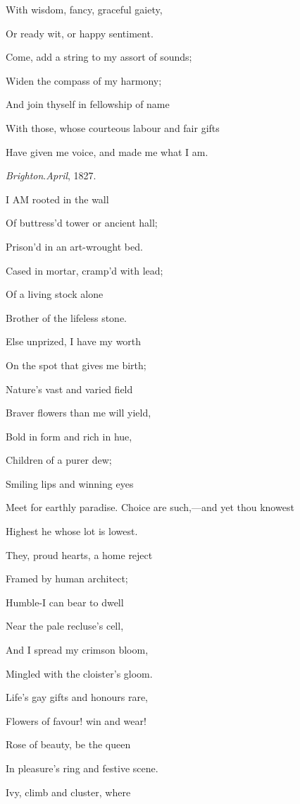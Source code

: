 With wisdom, fancy, graceful gaiety,

Or ready wit, or happy sentiment.

Come, add a string to my assort of
sounds;

Widen the compass of my harmony;

And join thyself in fellowship of name

With those, whose courteous labour and fair gifts

Have given me voice, and made me what I am.

\emph{Brighton}.\emph{April}, 1827.


I AM rooted in the wall

Of buttress'd tower or ancient hall;

Prison'd in an art-wrought bed.

Cased in mortar, cramp'd with lead;

Of a living stock alone

Brother of the lifeless stone.

Else unprized, I have my worth

On the spot that gives me birth;

Nature's vast and varied field

Braver flowers than me will yield,

Bold in form and rich in hue,

Children of a purer dew;

Smiling lips and winning eyes

Meet for earthly paradise. Choice are such,—and yet thou knowest

Highest he whose lot is lowest.

They, proud hearts, a home reject

Framed by human architect;

Humble-I can bear to dwell

Near the pale recluse's cell,

And I spread my crimson bloom,

Mingled with the cloister's gloom.

Life's gay gifts and honours rare,

Flowers of favour! win and wear!

Rose of beauty, be the queen

In pleasure's ring and festive scene.

Ivy, climb and cluster, where

